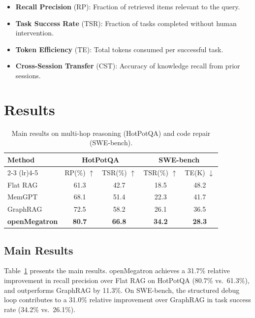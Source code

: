 \documentclass[11pt,a4paper]{article}
\begin{document}
\begin{itemize}
    \item \textbf{Recall Precision} (RP): Fraction of retrieved items relevant to the query.
    \item \textbf{Task Success Rate} (TSR): Fraction of tasks completed without human intervention.
    \item \textbf{Token Efficiency} (TE): Total tokens consumed per successful task.
    \item \textbf{Cross-Session Transfer} (CST): Accuracy of knowledge recall from prior sessions.
\end{itemize}

\section{Results}
\label{sec:results}

\begin{table}[t]
    \centering
    \caption{Main results on multi-hop reasoning (HotPotQA) and code repair (SWE-bench).}
    \label{tab:main}
    \begin{tabular}{lcccc}
        \toprule
        \multirow{2}{*}{Method} & \multicolumn{2}{c}{HotPotQA} & \multicolumn{2}{c}{SWE-bench} \\
        \cmidrule(lr){2-3} \cmidrule(lr){4-5}
         & RP(\%) $\uparrow$ & TSR(\%) $\uparrow$ & TSR(\%) $\uparrow$ & TE(K) $\downarrow$ \\
        \midrule
        Flat RAG & 61.3 & 42.7 & 18.5 & 48.2 \\
        MemGPT & 68.1 & 51.4 & 22.3 & 41.7 \\
        GraphRAG & 72.5 & 58.2 & 26.1 & 36.5 \\
        \textbf{openMegatron} & \textbf{80.7} & \textbf{66.8} & \textbf{34.2} & \textbf{28.3} \\
        \bottomrule
    \end{tabular}
\end{table}

\subsection{Main Results}

Table~\ref{tab:main} presents the main results. 
openMegatron achieves a 31.7\% relative improvement in recall precision over 
Flat RAG on HotPotQA (80.7\% vs.\ 61.3\%), and outperforms GraphRAG by 11.3\%.
On SWE-bench, the structured debug loop contributes to a 31.0\% relative 
improvement over GraphRAG in task success rate (34.2\% vs.\ 26.1\%).
\end{document}
